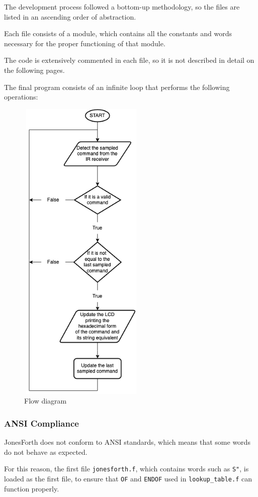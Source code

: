 \documentclass[a4paper, 12pt]{article}
\begin{document}
The development process followed a bottom-up methodology, so the files are listed in an ascending order of abstraction.

Each file consists of a module, which contains all the constants and words necessary for the proper functioning of that module.

The code is extensively commented in each file, so it is not described in detail on the following pages.

The final program consists of an infinite loop that performs the following operations:

\begin{figure}[h]
    \centering
    \includegraphics[height=15cm, width=6cm]{flow_diagram.png}
    \caption{Flow diagram}
\end{figure}

\subsubsection{ANSI Compliance}
JonesForth does not conform to ANSI\cite{ANSICompliance} standards, which means that some words do not behave as expected.

For this reason, the first file \texttt{jonesforth.f}, which contains words such as \texttt{S"}, is loaded as the first file, to ensure that \texttt{OF} and \texttt{ENDOF} used in \texttt{lookup\_table.f} can function properly.
\end{document}
